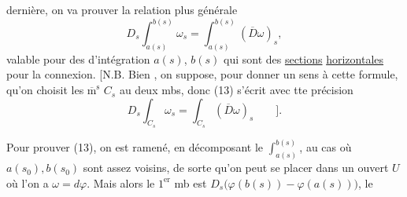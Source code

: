 dernière, on  va prouver la relation plus générale
\[
 D_s\int_{a(s)}^{b(s)}\omega_s=\int_{a(s)}^{b(s)}(\overline D\omega)_s,
 \tag*{(13)}
\]
valable pour des  d'intégration $a(s)$, $b(s)$ qui sont des \uline{sections} \uline{horizontales} pour la connexion. [N.B. Bien , on suppose, pour donner un sens à cette formule, qu'on choisit les $\overline{\mathrm m}^{\mathrm s}$ $C_s$ au deux mbs, donc (13) s'écrit avec tte précision
\[
 D_s\int_{C_s}\omega_s=\int_{C_s}(\overline D\omega)_s\qquad].
 \tag*{(13 bis)}
\]

Pour prouver (13), on est ramené, en  décomposant le  $\int_{a(s)}^{b(s)}$, au cas où $a(s_0),b(s_0)$ sont assez voisins, de sorte qu'on peut se placer dans un ouvert $U$ où l'on a $\omega=d\varphi$. Mais alors le $1^{\mathrm{er}}$ mb est $D_s\bigl(\varphi(b(s))-\varphi(a(s))\bigr)$, le
